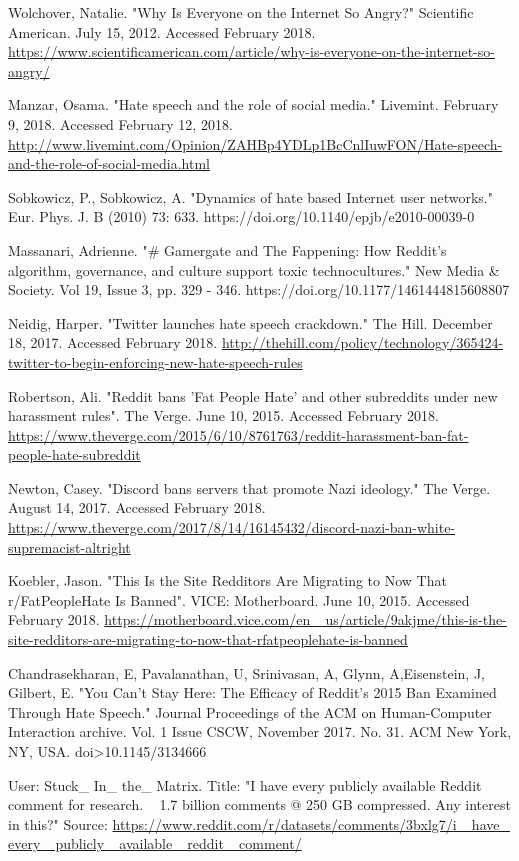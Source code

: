 \documentclass[twoside,twocolumn]{article}
\begin{document}
\begin{thebibliography}{99} %

 Wolchover, Natalie. "Why Is Everyone on the Internet So Angry?" Scientific American. July 15, 2012. Accessed February 2018. \url{https://www.scientificamerican.com/article/why-is-everyone-on-the-internet-so-angry/}
 
 Manzar, Osama. "Hate speech and the role of social media." Livemint. February 9, 2018. Accessed February 12, 2018. \url{http://www.livemint.com/Opinion/ZAHBp4YDLp1BcCnlIuwFON/Hate-speech-and-the-role-of-social-media.html}
 
 Sobkowicz, P., Sobkowicz, A. "Dynamics of hate based Internet user networks." Eur. Phys. J. B (2010) 73: 633. https://doi.org/10.1140/epjb/e2010-00039-0

 Massanari, Adrienne. "\# Gamergate and The Fappening: How Reddit’s algorithm, governance, and culture support toxic technocultures." New Media \& Society. Vol 19, Issue 3, pp. 329 - 346. https://doi.org/10.1177/1461444815608807

 Neidig, Harper. "Twitter launches hate speech crackdown." The Hill. December 18, 2017. Accessed February 2018. \url{http://thehill.com/policy/technology/365424-twitter-to-begin-enforcing-new-hate-speech-rules}

 Robertson, Ali. "Reddit bans 'Fat People Hate' and other subreddits under new harassment rules". The Verge. June 10, 2015. Accessed February 2018. \url{https://www.theverge.com/2015/6/10/8761763/reddit-harassment-ban-fat-people-hate-subreddit}

 Newton, Casey. "Discord bans servers that promote Nazi ideology." The Verge. August 14, 2017. Accessed February 2018. \url{https://www.theverge.com/2017/8/14/16145432/discord-nazi-ban-white-supremacist-altright}
  
 Koebler, Jason. "This Is the Site Redditors Are Migrating to Now That r/FatPeopleHate Is Banned". VICE: Motherboard. June 10, 2015. Accessed February 2018. \url{https://motherboard.vice.com/en\_ us/article/9akjme/this-is-the-site-redditors-are-migrating-to-now-that-rfatpeoplehate-is-banned}	 

 Chandrasekharan, E, Pavalanathan, U, Srinivasan, A, Glynn, A,Eisenstein, J, Gilbert, E. "You Can't Stay Here: The Efficacy of Reddit's 2015 Ban Examined Through Hate Speech." Journal Proceedings of the ACM on Human-Computer Interaction archive. Vol. 1 Issue CSCW, November 2017. No. 31. ACM New York, NY, USA. doi>10.1145/3134666

 User: Stuck\_ In\_ the\_ Matrix. Title: "I have every publicly available Reddit comment for research. ~ 1.7 billion comments @ 250 GB compressed. Any interest in this?" Source: \url{https://www.reddit.com/r/datasets/comments/3bxlg7/i\_ have\_ every\_ publicly\_ available\_ reddit\_ comment/}

\end{thebibliography}

%
%

\end{document}
